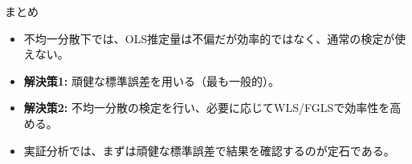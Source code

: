 \documentclass[
  ignorenonframetext,
]{beamer}
\providecommand{\tightlist}{%
  \setlength{\itemsep}{0pt}\setlength{\parskip}{0pt}}
\begin{document}
\begin{frame}{まとめ}
\label{ux307eux3068ux3081}
\begin{itemize}
\tightlist
\item
  不均一分散下では、OLS推定量は不偏だが効率的ではなく、通常の検定が使えない。
\item
  \textbf{解決策1:} 頑健な標準誤差を用いる（最も一般的）。
\item
  \textbf{解決策2:}
  不均一分散の検定を行い、必要に応じてWLS/FGLSで効率性を高める。
\item
  実証分析では、まずは頑健な標準誤差で結果を確認するのが定石である。
\end{itemize}
\end{frame}
\end{document}
